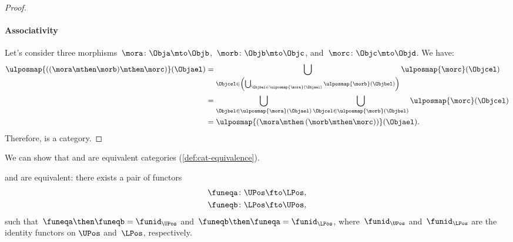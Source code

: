 \begin{proof}
    \paragraph*{Associativity} Let's consider three morphisms~$\mora\colon \Obja \mto \Objb$,~$\morb\colon \Objb\mto \Objc$, and~$\morc\colon \Objc\mto \Objd$.
    We have:
    \begin{equation*}
        \begin{aligned}
            \ulposmap{\left( (\mora \mthen \morb) \mthen \morc\right)}(\Objael)&=
            \bigcup_{\Objcel \in \left( \bigcup_{\Objbel \in \ulposmap{\mora}(\Objael)}\ulposmap{\morb}(\Objbel)\right)}\ulposmap{\morc}(\Objcel)\\
            &=\bigcup_{\Objbel\in \ulposmap{\mora}(\Objael)}\bigcup_{\Objcel\in \ulposmap{\morb}(\Objbel)}\ulposmap{\morc}(\Objcel)\\
            &=\ulposmap{\left( \mora \mthen \left( \morb\mthen \morc\right)\right)}(\Objael).
        \end{aligned}
    \end{equation*}
    Therefore, \UPos is a category.
\end{proof}



We can show that \UPos and \LPos are equivalent categories (\cref{def:cat-equivalence}).

\begin{lemma}
    \label{lem:ulposequiv}
    \UPos and \LPos are equivalent: there exists a pair of functors
    \begin{equation}
        \begin{aligned}
            \funeqa\colon \UPos&\fto \LPos,\\
            \funeqb\colon \LPos&\fto \UPos,
        \end{aligned}
    \end{equation}
    such that~$\funeqa \then \funeqb=\funid_{\UPos}$ and~$\funeqb \then \funeqa=\funid_{\LPos}$, where~$\funid_{\UPos}$ and~$\funid_{\LPos}$ are the identity functors on $\UPos$ and~$\LPos$, respectively.
\end{lemma}

